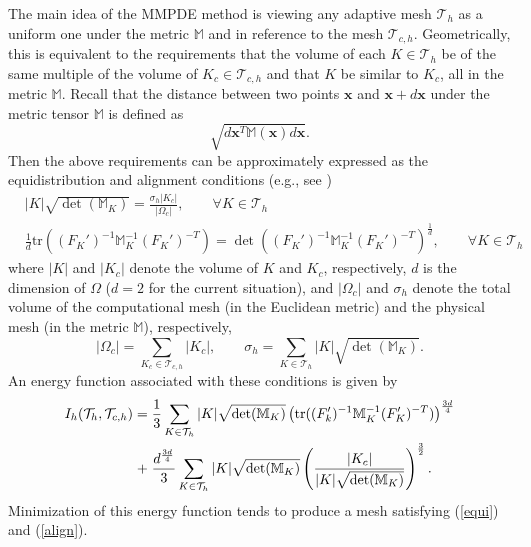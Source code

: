 \documentclass{siamart0516}
\def \M{\mathbb{M}}
\newcommand{\bx}{\mathbf{x}}
\theoremstyle{plain}%
\theoremstyle{definition}
\theoremstyle{remark}
\begin{document}
The main idea of the MMPDE method is viewing any adaptive mesh $\mathcal{T}_h$ as a uniform one
under the metric $\M$ and in reference to the mesh $\mathcal{T}_{c,h}$.
Geometrically, this is equivalent to the requirements that the volume of each $K \in \mathcal{T}_h$
be of the same multiple of the volume of $K_c\in \mathcal{T}_{c,h}$ and that $K$ be similar to $K_c$,
all in the metric $\M$. Recall that the distance between two points $\bx$ and $\bx + d\bx$
under the metric tensor $\M$ is defined as
\[
\sqrt{d\bx^T \M(\bx) d\bx }.
\]
Then the above requirements can be approximately expressed as the equidistribution and alignment conditions
(e.g., see \cite{HR11})
\begin{align}
& |K|\sqrt{\det(\M_K)}  = \frac{\sigma_h |K_c|}{|\Omega_c|}, \qquad \forall K \in \mathcal{T}_h
\label{equi}
\\
& \frac{1}{d}\text{tr}\left ( (F_K')^{-1}\M_K^{-1}(F_K')^{-T}\right ) =
\det \left ( (F_K')^{-1}\M_K^{-1}(F_K')^{-T}\right )^{\frac{1}{d}},
\qquad \forall K \in \mathcal{T}_h
\label{align}
\end{align}
where $|K|$ and $|K_c|$ denote the volume of $K$ and $K_c$, respectively, $d$ is the dimension of $\Omega$
($d = 2$ for the current situation),
and $|\Omega_c|$ and $\sigma_h$ denote the total volume of the computational
mesh (in the Euclidean metric) and the physical mesh (in the metric $\M$), respectively,
\[
|\Omega_c| = \sum_{K_c \in \mathcal{T}_{c,h}} |K_c| ,\qquad
\sigma_h = \sum \limits_{K\in \mathcal{T}_h} |K| \sqrt{\det(\M_K)}.
\]
An energy function associated with these conditions \cite{Hua01b} is given by
\begin{align}
I_h(\mathcal{T}_h, \mathcal{T}_{c,h})  = & \; \frac{1}{3} \sum_{K \in \mathcal{T}_h} |K| \sqrt{\det(\M_K)}
\left (\mathbf{\text{tr}}( (F_k')^{-1}\M_K^{-1}(F_K')^{-T}) \right )^{\frac{3 d}{4}}
\notag \\
+ & \; \frac{d^{\frac{3 d}{4}}}{3}    \sum_{K \in \mathcal{T}_h} |K| \sqrt{\det(\M_K)}
\left (\frac{|K_c|}{|K|\sqrt{\det(\M_K)}}\right )^{\frac{3}{2}} .
\label{ih}
\end{align}
Minimization of this energy function tends to produce a mesh satisfying (\ref{equi}) and (\ref{align}).
\end{document}

